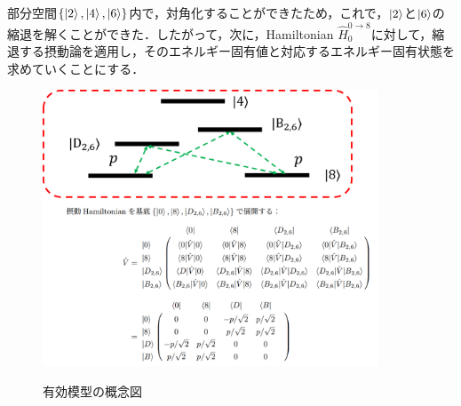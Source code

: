 \subsection{}
部分空間$\{\ket{2}, \ket{4}, \ket{6}\}$内で，対角化することができたため，これで，$\ket{2}$と$\ket{6}$の縮退を解くことができた．したがって，次に，Hamiltonian $\hat{H}_0^{0\to8}$に対して，縮退する摂動論を適用し，そのエネルギー固有値と対応するエネルギー固有状態を求めていくことにする．
\begin{figure}[h]
\centering
		\includegraphics[width=10cm]{file/fig/effective_0and8/KPO_effective_0and8_4.png} \\
\caption{有効模型の概念図}
\label{fig:kpo_effective_0and8_4}
\end{figure}









